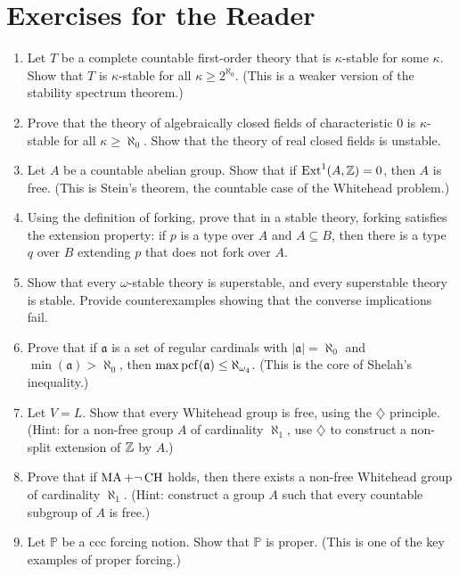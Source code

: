 \section*{Exercises for the Reader}

\begin{enumerate}
    \item [I] Let \(T\) be a complete countable first-order theory that is \(\kappa\)-stable for some \(\kappa\). Show that \(T\) is \(\kappa\)-stable for all \(\kappa \geq 2^{\aleph_0}\). (This is a weaker version of the stability spectrum theorem.)
    \item [I] Prove that the theory of algebraically closed fields of characteristic 0 is \(\kappa\)-stable for all \(\kappa \geq \aleph_0\). Show that the theory of real closed fields is unstable.
    \item [I] Let \(A\) be a countable abelian group. Show that if \(\operatorname{Ext}^1(A,\mathbb{Z}) = 0\), then \(A\) is free. (This is Stein's theorem, the countable case of the Whitehead problem.)
    \item [I] Using the definition of forking, prove that in a stable theory, forking satisfies the extension property: if \(p\) is a type over \(A\) and \(A \subseteq B\), then there is a type \(q\) over \(B\) extending \(p\) that does not fork over \(A\).
    \item [I] Show that every \(\omega\)-stable theory is superstable, and every superstable theory is stable. Provide counterexamples showing that the converse implications fail.
    \item [A] Prove that if \(\mathfrak{a}\) is a set of regular cardinals with \(|\mathfrak{a}| = \aleph_0\) and \(\min(\mathfrak{a}) > \aleph_0\), then \(\max \operatorname{pcf}(\mathfrak{a}) \leq \aleph_{\omega_4}\). (This is the core of Shelah's inequality.)
    \item [A] Let \(V = L\). Show that every Whitehead group is free, using the \(\diamondsuit\) principle. (Hint: for a non-free group \(A\) of cardinality \(\aleph_1\), use \(\diamondsuit\) to construct a non-split extension of \(\mathbb{Z}\) by \(A\).)
    \item [A] Prove that if \(\operatorname{MA} + \neg\operatorname{CH}\) holds, then there exists a non-free Whitehead group of cardinality \(\aleph_1\). (Hint: construct a group \(A\) such that every countable subgroup of \(A\) is free.)
    \item [I] Let \(\mathbb{P}\) be a ccc forcing notion. Show that \(\mathbb{P}\) is proper. (This is one of the key examples of proper forcing.)

\end{enumerate}
